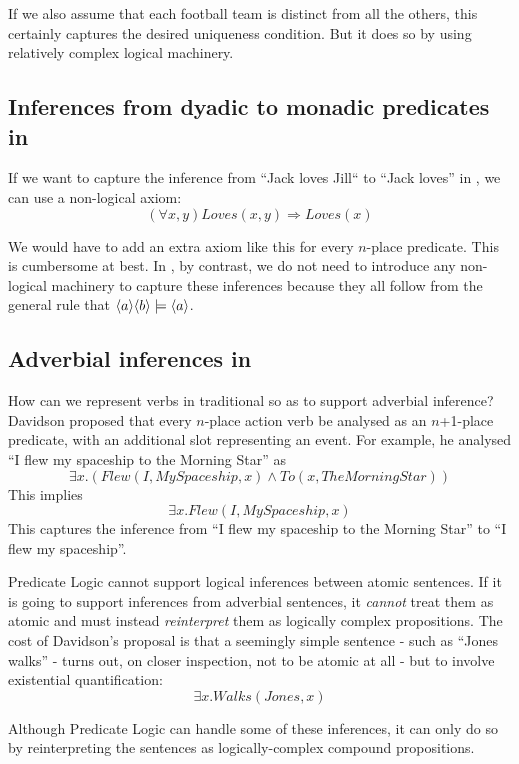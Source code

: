 \NI If we also assume that each football team is distinct from all the
others, this certainly captures the desired uniqueness condition.  But
it does so by using relatively complex logical machinery.



\subsection{Inferences from dyadic to monadic predicates in \fol}
If we want to capture the inference from ``Jack loves Jill`` to ``Jack
loves'' in \fol{}, we can use a non-logical axiom:
\[
(\forall x, y) Loves(x,y) \Rightarrow Loves(x)
\]

\NI We would have to add an extra  axiom like this for every
$n$-place predicate.  This is cumbersome at best.  In \cathoristic{}, by
contrast, we do not need to introduce any non-logical machinery 
to capture these inferences because they all follow from the general
rule that $\MAY{a} \MAY{b} \models \MAY{a}$.

\subsection{Adverbial inferences in \fol{}}

\NI How can we represent verbs in traditional \fol{} so as to
support adverbial inference?  Davidson \cite{davidson2} proposed that
every $n$-place action verb be analysed as an $n$+1-place predicate,
with an additional slot representing an event.  For example, he
analysed ``I flew my spaceship to the Morning Star'' as
\[
\exists x. ( Flew(I, MySpaceship, x) \land To(x, TheMorningStar))
\]
This implies 
\[
\exists x.  Flew(I, MySpaceship, x)
\]
This captures the inference from ``I flew my spaceship to the Morning Star'' to ``I flew my spaceship''.

Predicate Logic cannot support logical inferences between atomic sentences. 
If it is going to support inferences from adverbial sentences, it \emph{cannot} treat them as atomic and must instead \emph{reinterpret} them as logically complex propositions.
The cost of Davidson's proposal is that a seemingly simple sentence - such as ``Jones walks'' - turns out, on closer inspection, not to be atomic at all -  but to involve existential quantification:
\[
\exists x.  Walks(Jones, x)
\]

\NI Although Predicate Logic can handle some of these inferences, it
can only do so by reinterpreting the sentences as logically-complex
compound propositions.

